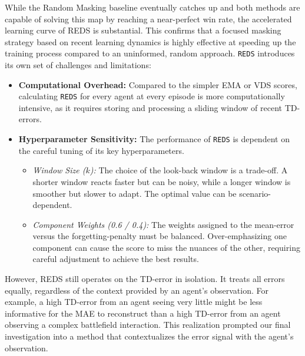While the Random Masking baseline eventually catches up and both methods are capable of solving this map by reaching a near-perfect win rate, the accelerated learning curve of REDS is substantial. This confirms that a focused masking strategy based on recent learning dynamics is highly effective at speeding up the training process compared to an uninformed, random approach.
\texttt{REDS} introduces its own set of challenges and limitations:
\begin{itemize}
    \item \textbf{Computational Overhead:} Compared to the simpler EMA or VDS scores, calculating \texttt{REDS} for every agent at every episode is more computationally intensive, as it requires storing and processing a sliding window of recent TD-errors.
    
    \item \textbf{Hyperparameter Sensitivity:} The performance of \texttt{REDS} is dependent on the careful tuning of its key hyperparameters.
    \begin{itemize}
        \item \textit{Window Size ($k$):} The choice of the look-back window is a trade-off. A shorter window reacts faster but can be noisy, while a longer window is smoother but slower to adapt. The optimal value can be scenario-dependent.
        
        \item \textit{Component Weights (0.6 / 0.4):} The weights assigned to the mean-error versus the forgetting-penalty must be balanced. Over-emphasizing one component can cause the score to miss the nuances of the other, requiring careful adjustment to achieve the best results.
    \end{itemize}
\end{itemize}
However, REDS still operates on the TD-error in isolation. It treats all errors equally, regardless of the context provided by an agent's observation. For example, a high TD-error from an agent seeing very little might be less informative for the MAE to reconstruct than a high TD-error from an agent observing a complex battlefield interaction. This realization prompted our final investigation into a method that contextualizes the error signal with the agent's observation.

